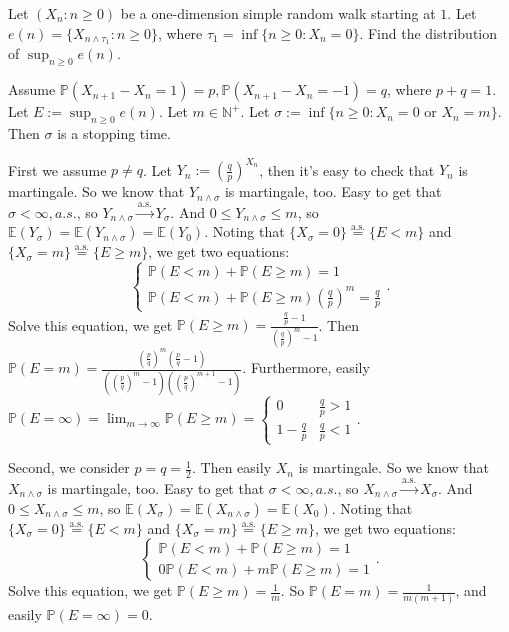 \documentclass{ctexart}
\begin{document}
\begin{problem}\label{pro:2}
  Let \((X_{n}: n \geq 0)\) be a one-dimension simple random walk starting at \(1\).
  Let \(e(n)=\{X_{n \wedge \tau_1}: n \geq 0\}\), where \(\tau_1=\inf \{n \geq 0: X_{n}=0\}\).
  Find the distribution of \(\sup_{n \geq 0}e(n)\).
\end{problem}
\begin{solution}
  Assume \(\mathbb{P}(X_{n+1}-X_n=1)=p,\mathbb{P}(X_{n+1}-X_n=-1)=q\), where \(p+q=1\).
  Let \(E:=\sup_{n \geq 0}e(n)\).
  Let \(m \in \mathbb{N}^+\).
  Let \(\sigma:=\inf \{n \geq 0:X_n=0 \text{ or } X_n=m\}\). Then \(\sigma\) is a stopping time.

  First we assume \(p \neq  q\).
  Let \(Y_n:=\left(\frac{q}{p}\right)^{X_n}\), then it's easy to check that \(Y_n\) is martingale.
  So we know that \(Y_{n \wedge \sigma}\) is martingale, too.
  Easy to get that \(\sigma<\infty,a. s.\), so \(Y_{n \wedge \sigma} \overset{\text{a.s.}}{\to} Y_{\sigma}\).
  And \(0 \leq Y_{n \wedge \sigma} \leq m\), so \(\mathbb{E}(Y_{\sigma})=\mathbb{E}(Y_{n \wedge \sigma})=\mathbb{E}(Y_0)\).
  Noting that \(\{X_\sigma =0\}\overset{\text{a.s.}}{=}\{E<m\}\) and \(\{X_{\sigma}= m\}\overset{\text{a.s.}}{=}\{E \geq m\}\),
  we get two equations:
  \[
    \begin{cases}
      \mathbb{P}(E<m)+\mathbb{P}(E \geq m)=1 \\
      \mathbb{P}(E<m)+\mathbb{P}(E \geq m) \left(\frac{q}{p}\right)^m =\frac{q}{p}
    \end{cases}.
  \]
  Solve this equation, we get \(\mathbb{P}(E \geq m)=\frac{\frac{q}{p}-1}{(\frac{q}{p})^m-1}\).
  Then \(\mathbb{P}(E=m)=\frac{(\frac{p}{q})^m(\frac{p}{q}-1)}{((\frac{p}{q})^m-1)((\frac{p}{q})^{m+1}-1)}\).
  Furthermore, easily \(\mathbb{P}(E=\infty)=\lim_{m \to \infty}\mathbb{P}(E \geq m)=\begin{cases}
    0             & \frac{q}{p}>1 \\
    1-\frac{q}{p} & \frac{q}{p}<1
  \end{cases}\).

  Second, we consider \(p=q=\frac{1}{2}\). Then easily \(X_n\) is martingale.
  So we know that \(X_{n \wedge \sigma}\) is martingale, too.
  Easy to get that \(\sigma<\infty,a. s.\), so \(X_{n \wedge \sigma} \overset{\text{a.s.}}{\to} X_{\sigma}\).
  And \(0 \leq X_{n \wedge \sigma} \leq m\), so \(\mathbb{E}(X_{\sigma})=\mathbb{E}(X_{n \wedge \sigma})=\mathbb{E}(X_0)\).
  Noting that \(\{X_\sigma =0\}\overset{\text{a.s.}}{=}\{E<m\}\) and \(\{X_{\sigma}= m\}\overset{\text{a.s.}}{=}\{E \geq m\}\),
  we get two equations:
  \[
    \begin{cases}
      \mathbb{P}(E<m)+\mathbb{P}(E \geq m)=1 \\
      0\mathbb{P}(E<m)+m\mathbb{P}(E \geq m) =1
    \end{cases}.
  \]
  Solve this equation, we get \(\mathbb{P}(E \geq m)=\frac{1}{m}\).
  So \(\mathbb{P}(E=m)=\frac{1}{m(m+1)}\), and easily \(\mathbb{P}(E=\infty)=0\).
\end{solution}
\end{document}
